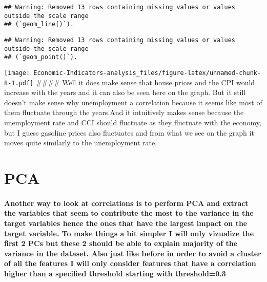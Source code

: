 \documentclass[
]{article}
\begin{document}
\begin{verbatim}
## Warning: Removed 13 rows containing missing values or values outside the scale range
## (`geom_line()`).
\end{verbatim}

\begin{verbatim}
## Warning: Removed 13 rows containing missing values or values outside the scale range
## (`geom_point()`).
\end{verbatim}

\texttt{[image: Economic-Indicators-analysis\_files/figure-latex/unnamed-chunk-8-1.pdf]}
\#\#\#\# Well it does make sense that house prices and the CPI would
increase with the years and it can also be seen here on the graph. But
it still doesn't make sense why unemployment a correlation because it
seems like most of them fluctuate through the years.And it intuitively
makes sense because the unemployment rate and CCI should fluctuate as
they fluctuate with the economy, but I guess gasoline prices also
fluctuates and from what we see on the graph it moves quite similarly to
the unemployment rate.

\hypertarget{pca}{%
\section{PCA}\label{pca}}

\hypertarget{another-way-to-look-at-correlations-is-to-perform-pca-and-extract-the-variables-that-seem-to-contribute-the-most-to-the-variance-in-the-target-variables-hence-the-ones-that-have-the-largest-impact-on-the-target-variable.-to-make-things-a-bit-simpler-i-will-only-vizualize-the-first-2-pcs-but-these-2-should-be-able-to-explain-majority-of-the-variance-in-the-dataset.-also-just-like-before-in-order-to-avoid-a-cluster-of-all-the-features-i-will-only-consider-features-that-have-a-correlation-higher-than-a-specified-threshold-starting-with-threshold0.3}{%
\paragraph{Another way to look at correlations is to perform PCA and
extract the variables that seem to contribute the most to the variance
in the target variables hence the ones that have the largest impact on
the target variable. To make things a bit simpler I will only vizualize
the first 2 PCs but these 2 should be able to explain majority of the
variance in the dataset. Also just like before in order to avoid a
cluster of all the features I will only consider features that have a
correlation higher than a specified threshold starting with
threshold=0.3}\label{another-way-to-look-at-correlations-is-to-perform-pca-and-extract-the-variables-that-seem-to-contribute-the-most-to-the-variance-in-the-target-variables-hence-the-ones-that-have-the-largest-impact-on-the-target-variable.-to-make-things-a-bit-simpler-i-will-only-vizualize-the-first-2-pcs-but-these-2-should-be-able-to-explain-majority-of-the-variance-in-the-dataset.-also-just-like-before-in-order-to-avoid-a-cluster-of-all-the-features-i-will-only-consider-features-that-have-a-correlation-higher-than-a-specified-threshold-starting-with-threshold0.3}}
\end{document}
